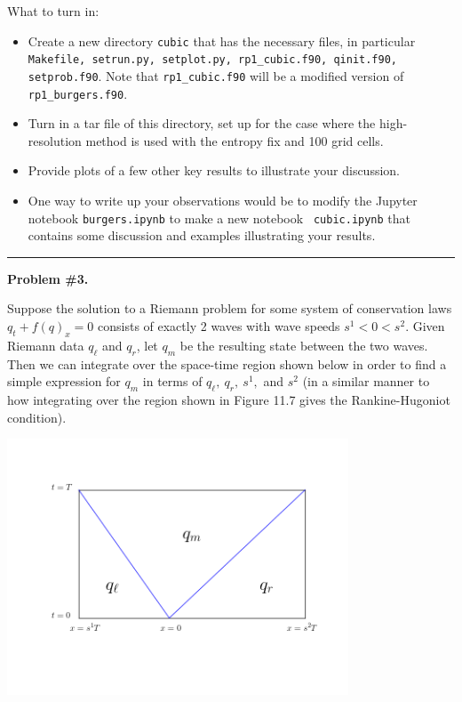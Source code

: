 \documentclass[11pt]{article}
\begin{document}
What to turn in:
\begin{itemize}
\item Create a new directory \verb+cubic+ that has the necessary files, in
particular {\tt Makefile, setrun.py, setplot.py, rp1\_cubic.f90, qinit.f90,
setprob.f90}.  Note that {\tt rp1\_cubic.f90} will be a modified version of
{\tt rp1\_burgers.f90}.  
\item Turn in a tar file of this directory, set up for the case where the
high-resolution method is used with the entropy fix and 100 grid cells.
\item Provide plots of a few other key results to illustrate your
discussion.
\item One way to write up your observations would be to
modify the Jupyter notebook {\tt burgers.ipynb} to make a new notebook {\tt
cubic.ipynb} that contains some discussion and examples illustrating 
your results.
\end{itemize} 




\newpage
\vskip 1cm
\hrule
{\bf Problem \#3.}

Suppose the solution to a Riemann problem for some system of conservation
laws $q_t +f(q)_x = 0$ 
consists of exactly 2 waves with wave speeds $s^1 < 0 < s^2$.  
Given Riemann data $q_\ell$ and $q_r$, let $q_m$ be the resulting state
between the two waves.
Then we can integrate over the space-time region shown below in order to
find a simple expression for $q_m$ in terms of $q_\ell,~ q_r, ~s^1,$ and
$s^2$ (in a similar manner to how integrating 
over the region shown in Figure 11.7 gives the Rankine-Hugoniot condition).

\hfil\includegraphics[width=4.0in]{qbox.png}\hfil
\end{document}
